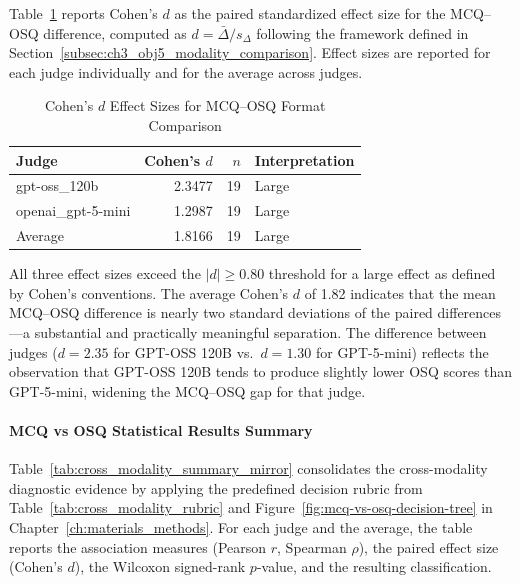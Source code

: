 Table~\ref{tab:effect_sizes_mirror} reports Cohen's $d$ as the paired standardized effect size for the MCQ--OSQ difference, computed as $d = \bar{\Delta}/s_{\Delta}$ following the framework defined in Section~\ref{subsec:ch3_obj5_modality_comparison}. Effect sizes are reported for each judge individually and for the average across judges.

\begin{table}[htbp]
\centering
\caption{Cohen's $d$ Effect Sizes for MCQ--OSQ Format Comparison}
\label{tab:effect_sizes_mirror}
\begin{tabular}{lrrl}
\toprule
Judge & Cohen's $d$ & $n$ & Interpretation \\
\midrule
gpt-oss\_120b        & 2.3477 & 19 & Large \\
openai\_gpt-5-mini  & 1.2987 & 19 & Large \\
Average             & 1.8166 & 19 & Large \\
\bottomrule
\end{tabular}
\end{table}

All three effect sizes exceed the $|d| \geq 0.80$ threshold for a large effect as defined by Cohen's conventions. The average Cohen's $d$ of 1.82 indicates that the mean MCQ--OSQ difference is nearly two standard deviations of the paired differences---a substantial and practically meaningful separation. The difference between judges ($d = 2.35$ for GPT-OSS 120B vs.\ $d = 1.30$ for GPT-5-mini) reflects the observation that GPT-OSS 120B tends to produce slightly lower OSQ scores than GPT-5-mini, widening the MCQ--OSQ gap for that judge.


\paragraph{MCQ vs OSQ Statistical Results Summary}

Table~\ref{tab:cross_modality_summary_mirror} consolidates the cross-modality diagnostic evidence by applying the predefined decision rubric from Table~\ref{tab:cross_modality_rubric} and Figure~\ref{fig:mcq-vs-osq-decision-tree} in Chapter~\ref{ch:materials_methods}. For each judge and the average, the table reports the association measures (Pearson $r$, Spearman $\rho$), the paired effect size (Cohen's $d$), the Wilcoxon signed-rank $p$-value, and the resulting classification.

